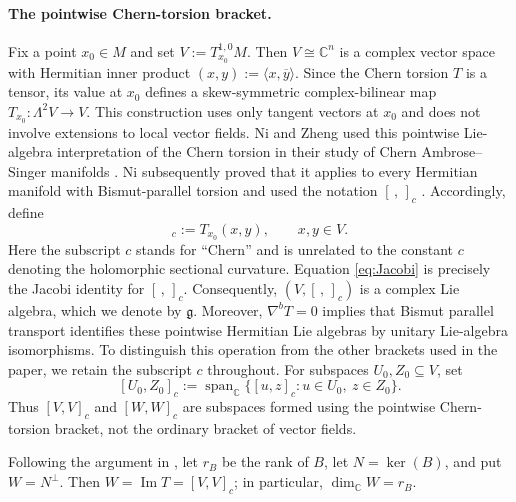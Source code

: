 \documentclass{amsart}
\newcommand{\C}{{\mathbb C}}
\newcommand{\revnote}[1]{\par\Needspace{10\baselineskip}\smallskip\noindent
  {\color{orange}\textbf{Revision note.} #1}\par\nopagebreak[4]\smallskip}
\begin{document}


\paragraph{\textbf{The pointwise Chern-torsion bracket.}}
Fix a point $x_0\in M$ and set $V:=T^{1,0}_{x_0}M$. Then
$V\cong\mathbb C^n$ is a complex vector space with Hermitian inner product
$(x,y):=\langle x,\overline y\rangle$. Since the Chern torsion $T$ is a
tensor, its value at $x_0$ defines a skew-symmetric complex-bilinear map
$T_{x_0}\colon\Lambda^2V\to V$. This construction uses only tangent vectors
at $x_0$ and does not involve extensions to local vector fields. Ni and Zheng
used this pointwise Lie-algebra interpretation of the Chern torsion in their
study of Chern Ambrose--Singer manifolds \cite{NiZ23}. Ni subsequently proved
that it applies to every Hermitian manifold with Bismut-parallel torsion and
used the notation $[\, ,\, ]_c$ \cite[Theorem 4.1]{Ni25}. Accordingly, define
\begin{equation}
[x,y]_c:=T_{x_0}(x,y),\qquad x,y\in V. \label{eq:Lie}
\end{equation}
Here the subscript $c$ stands for ``Chern'' and is unrelated to the constant
$c$ denoting the holomorphic sectional curvature. Equation
\eqref{eq:Jacobi} is precisely the Jacobi identity for $[\, ,\, ]_c$.
Consequently, $(V,[\, ,\, ]_c)$ is a complex Lie algebra, which we denote by
$\mathfrak g$. Moreover, $\nabla^bT=0$ implies that Bismut parallel transport
identifies these pointwise Hermitian Lie algebras by unitary Lie-algebra
isomorphisms. To distinguish this operation from the other brackets used in
the paper, we retain the subscript $c$ throughout. For subspaces
$U_0,Z_0\subseteq V$, set
\[
[U_0,Z_0]_c:=\operatorname{span}_{\mathbb C}
\{[u,z]_c:u\in U_0,\ z\in Z_0\}.
\]
Thus $[V,V]_c$ and $[W,W]_c$ are subspaces formed using the pointwise
Chern-torsion bracket, not the ordinary bracket of vector fields.


Following the argument in \cite{WZ}, let $r_B$ be the rank of $B$, let
$N=\ker(B)$, and put $W=N^\perp$. Then
$W=\operatorname{Im}T=[V,V]_c$; in particular, $\dim_{\C}W=r_B$.
\end{document}
